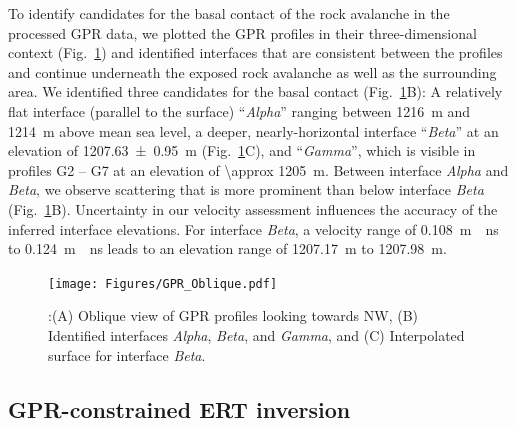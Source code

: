 \documentclass[utf8]{frontiersSCNS}
\begin{document}
To identify candidates for the basal contact of the rock avalanche in the processed GPR data, we plotted the GPR profiles in their three-dimensional context (Fig.~\ref{GPR_Oblique}) and identified interfaces that are consistent between the profiles and continue underneath the exposed rock avalanche as well as the surrounding area. We identified three candidates for the basal contact (Fig.~\ref{GPR_Oblique}B): A relatively flat interface (parallel to the surface) ``\emph{Alpha}'' ranging between \SI{1216}{m} and \SI{1214}{m} above mean sea level, a deeper, nearly-horizontal interface ``\emph{Beta}''  at an elevation of \SI{1207.63 \pm 0.95}{\m} (Fig.~\ref{GPR_Oblique}C), and ``\emph{Gamma}'', which is visible in profiles G2 -- G7 at an elevation of \SI{\approx 1205}{m}. Between interface \emph{Alpha} and \emph{Beta}, we observe scattering that is more prominent than below interface \emph{Beta} (Fig.~\ref{GPR_Oblique}B). Uncertainty in our velocity assessment influences the accuracy of the inferred interface elevations. For interface \emph{Beta}, a velocity range of \SI{0.108}{m \per ns} to \SI{0.124}{m \per ns} leads to an elevation range of \SI{1207.17}{m} to \SI{1207.98}{m}.



								 \begin{figure}

	\texttt{[image: Figures/GPR\_Oblique.pdf]}
		\caption{:(A) Oblique view of GPR profiles looking towards NW, (B) Identified interfaces \emph{Alpha}, \emph{Beta}, and \emph{Gamma}, and (C) Interpolated surface for interface \emph{Beta}. \label{GPR_Oblique}}

								   \end{figure}

							   
			   

								   
\subsection{GPR-constrained ERT inversion}
\end{document}
